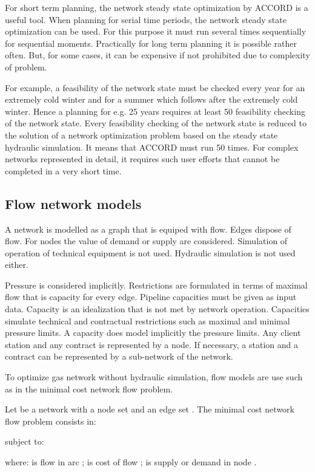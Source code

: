 \documentclass{article}
\begin{document}
For short term planning, the network steady state optimization by ACCORD is
a useful tool. When planning for serial time periods, the network steady
state optimization can be used. For this purpose it must run several times
sequentially for sequential moments. Practically for long term planning it
is possible rather often. But, for some cases, it can be expensive if not
prohibited due to complexity of problem.

For example, a feasibility of the network state must be checked every year
for an extremely cold winter and for a summer which follows after the
extremely cold winter. Hence a planning for e.g. 25 years requires at least
50 feasibility checking of the network state. Every feasibility checking of
the network state is reduced to the solution of a network optimization
problem based on the steady state hydraulic simulation. It means that ACCORD
must run 50 times. For complex networks represented in detail, it requires
such user efforts that cannot be completed in a very short time.

\subsection{Flow network models}

A network is modelled as a graph that is equiped with flow. Edges dispose of
flow. For nodes the value of demand or supply are considered. Simulation of
operation of technical equipment is not used. Hydraulic simulation is not
used either.

Pressure is considered implicitly. Restrictions are formulated in terms of
maximal flow that is capacity for every edge. Pipeline capacities must be
given as input data. Capacity is an idealization that is not met by network
operation. Capacities simulate technical and contractual restrictions such
as maximal and minimal pressure limits. A capacity does model implicitly the
pressure limits. Any client station and any contract is represented by a
node. If necessary, a station and a contract can be represented by a
sub-network of the network.

To optimize gas network without hydraulic simulation, flow models are use
such as in the minimal cost network flow problem.

Let  be a network with a node set  and an edge set . The
minimal cost network flow problem consists in:

subject to:



where:  is flow in arc ;  is cost of flow  ;  is supply or demand in node  .
\end{document}
